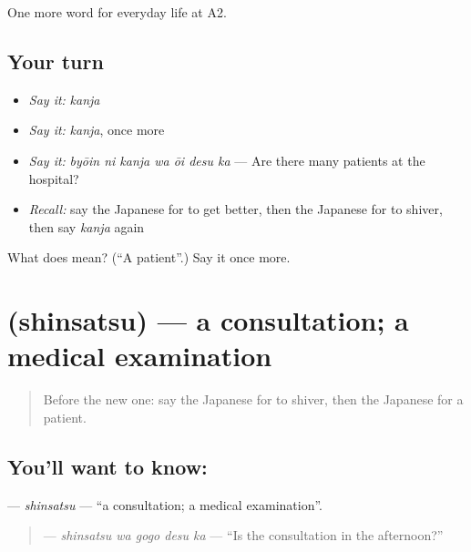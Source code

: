 \begin{grammarlens}[title={What you've built}]
One more word for everyday life at A2.
\end{grammarlens}

\subsection*{Your turn}
\begin{itemize}
\raggedright
  \item \emph{Say it:} \emph{kanja}
  \item \emph{Say it:} \emph{kanja}, once more
  \item \emph{Say it:} \emph{byōin ni kanja wa ōi desu ka} — Are there many patients at the hospital?
  \item \emph{Recall:} say the Japanese for to get better, then the Japanese for to shiver, then say \emph{kanja} again
\end{itemize}

\begin{tcolorbox}[breakable,colback=teal!4,colframe=teal!35!black,title={Before you move on}]
What does  mean? (\textquotedblleft{}A patient\textquotedblright{}.) Say it once more.
\end{tcolorbox}
\section[\texorpdfstring{\ja{しんさつ} (shinsatsu)}{しんさつ (shinsatsu)}]{ (shinsatsu) — a consultation; a medical examination}

\label{lesson:JA-C217-shinsatsu}



\begin{quote}
Before the new one: say the Japanese for to shiver, then the Japanese for a patient.
\end{quote}

\subsection*{You'll want to know: }
\textbf{} — \emph{shinsatsu} — \textquotedblleft{}a consultation; a medical examination\textquotedblright{}.

\begin{quote}
\textbf{ } — \emph{shinsatsu wa gogo desu ka} — \textquotedblleft{}Is the consultation in the afternoon?\textquotedblright{}
\end{quote}

